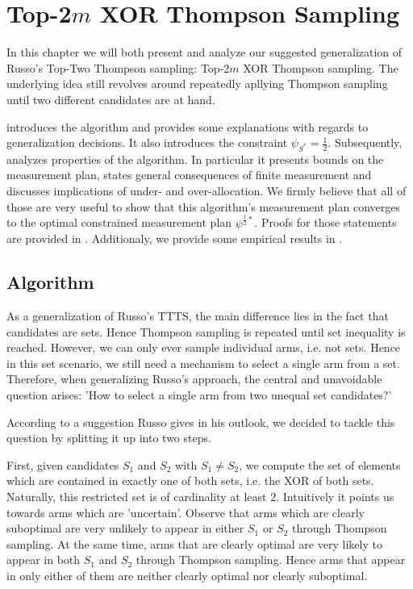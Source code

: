 \chapter{Top-2$m$ XOR Thompson Sampling}

In this chapter we will both present and analyze our suggested generalization of Russo's Top-Two Thompson sampling: Top-2$m$ XOR Thompson sampling. The underlying idea still revolves around repeatedly apllying Thompson sampling until two different candidates are at hand.

 introduces the algorithm and provides some explanations with regards to generalization decisions. It also introduces the constraint $\psi_{S^*} = \frac{1}{2}$. Subsequently,  analyzes properties of the algorithm. In particular it presents bounds on the measurement plan, states general consequences of finite measurement and discusses implications of under- and over-allocation. We firmly believe that all of those are very useful to show that this algorithm's measurement plan converges to the optimal constrained measurement plan $\psi^{\frac{1}{2}*}$. Proofs for those statements are provided in . Additionaly, we provide some empirical results in .

\section{Algorithm}\label{section:algorithm}
As a generalization of Russo's TTTS, the main difference lies in the fact that candidates are sets. Hence Thompson sampling is repeated until set inequality is reached. However, we can only ever sample individual arms, i.e. not sets. Hence in this set scenario, we still need a mechanism to select a single arm from a set. Therefore, when generalizing Russo's approach, the central and unavoidable question arises: 'How to select a single arm from two unequal set candidates?'

According to a suggestion Russo gives in his outlook, we decided to tackle this question by splitting it up into two steps.

First, given candidates $S_1$ and $S_2$ with $S_1 \neq S_2$, we compute the set of elements which are contained in exactly one of both sets, i.e. the XOR of both sets. Naturally, this restricted set is of cardinality at least 2. Intuitively it points us towards arms which are 'uncertain'. Observe that arms which are clearly suboptimal are very unlikely to appear in either $S_1$ or $S_2$ through Thompson sampling. At the same time, arms that are clearly optimal are very likely to appear in both $S_1$ and $S_2$ through Thompson sampling. Hence arms that appear in only either of them are neither clearly optimal nor clearly suboptimal.

